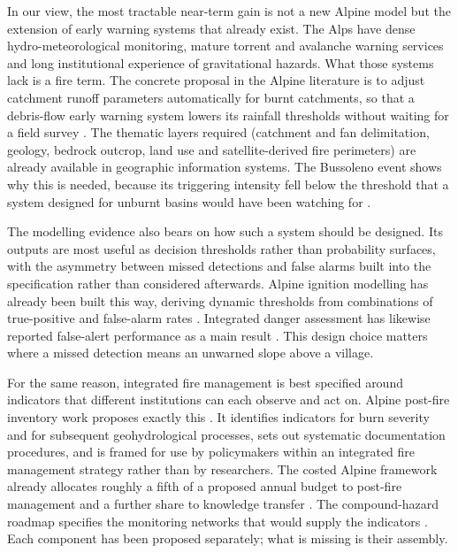 \documentclass[11pt,a4paper]{article}
\begin{document}
In our view, the most tractable near-term gain is not a new Alpine model but the extension of early warning systems that already exist. The Alps have dense hydro-meteorological monitoring, mature torrent and avalanche warning services and long institutional experience of gravitational hazards. What those systems lack is a fire term. The concrete proposal in the Alpine literature is to adjust catchment runoff parameters automatically for burnt catchments, so that a debris-flow early warning system lowers its rainfall thresholds without waiting for a field survey \citep{tiranti_wildfires_2021}. The thematic layers required (catchment and fan delimitation, geology, bedrock outcrop, land use and satellite-derived fire perimeters) are already available in geographic information systems. The Bussoleno event shows why this is needed, because its triggering intensity fell below the threshold that a system designed for unburnt basins would have been watching for \citep{laporta_postwildfire_2025}.

The modelling evidence also bears on how such a system should be designed. Its outputs are most useful as decision thresholds rather than probability surfaces, with the asymmetry between missed detections and false alarms built into the specification rather than considered afterwards. Alpine ignition modelling has already been built this way, deriving dynamic thresholds from combinations of true-positive and false-alarm rates \citep{moreno_1_nodate}. Integrated danger assessment has likewise reported false-alert performance as a main result \citep{muller_towards_2020}. This design choice matters where a missed detection means an unwarned slope above a village.

For the same reason, integrated fire management is best specified around indicators that different institutions can each observe and act on. Alpine post-fire inventory work proposes exactly this \citep{melzner_wildfire-induced_2025}. It identifies indicators for burn severity and for subsequent geohydrological processes, sets out systematic documentation procedures, and is framed for use by policymakers within an integrated fire management strategy rather than by researchers. The costed Alpine framework already allocates roughly a fifth of a proposed annual budget to post-fire management and a further share to knowledge transfer \citep{muller_forest_2020}. The compound-hazard roadmap specifies the monitoring networks that would supply the indicators \citep{baselt_compound_2026}. Each component has been proposed separately; what is missing is their assembly.
\end{document}
